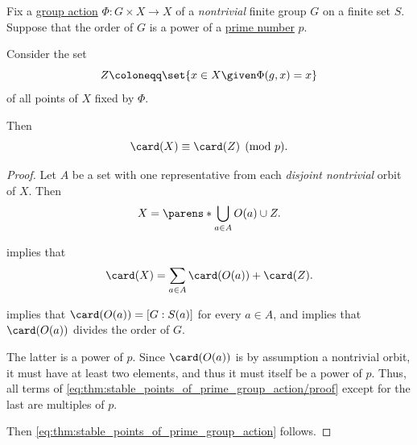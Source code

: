 \begin{lemma}\label{thm:stable_points_of_prime_group_action}
  Fix a \hyperref[def:group_action]{group action} \( \Phi: G \times X \to X \) of a \emph{nontrivial} finite group \( G \) on a finite set \( S \). Suppose that the order of \( G \) is a power of a \hyperref[def:prime_number]{prime number} \( p \).

  Consider the set
  \begin{equation}\label{eq:thm:stable_points_of_prime_group_action/fixed}
    Z \coloneqq \set{ x \in X \given \Phi(g, x) = x }
  \end{equation}
  of all points of \( X \) fixed by \( \Phi \).

  Then
  \begin{equation}\label{eq:thm:stable_points_of_prime_group_action}
    \card(X) \equiv \card(Z) \pmod p.
  \end{equation}
\end{lemma}
\begin{proof}
  Let \( A \) be a set with one representative from each \emph{disjoint nontrivial} orbit of \( X \). Then
  \begin{equation*}
    X = \parens*{ \bigcup_{a \in A} O(a) } \cup Z.
  \end{equation*}

   implies that
  \begin{equation}\label{eq:thm:stable_points_of_prime_group_action/proof}
    \card(X) = \sum_{a \in A} \card(O(a)) + \card(Z).
  \end{equation}

   implies that \( \card(O(a)) = [G: S(a)] \) for every \( a \in A \), and  implies that \( \card(O(a)) \) divides the order of \( G \).

  The latter is a power of \( p \). Since \( \card(O(a)) \) is by assumption a nontrivial orbit, it must have at least two elements, and thus it must itself be a power of \( p \). Thus, all terms of \eqref{eq:thm:stable_points_of_prime_group_action/proof} except for the last are multiples of \( p \).

  Then \eqref{eq:thm:stable_points_of_prime_group_action} follows.
\end{proof}

